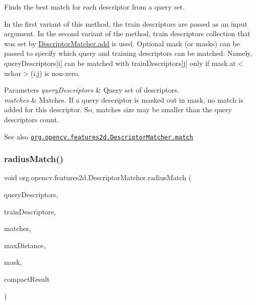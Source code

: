 Finds the best match for each descriptor from a query set.

In the first variant of this method, the train descriptors are passed as an input argument. In the second variant of the method, train descriptors collection that was set by {\ttfamily \mbox{\hyperlink{classorg_1_1opencv_1_1features2d_1_1_descriptor_matcher_aae08a476f7626406fb238bd32b28d1a3}{Descriptor\+Matcher.\+add}}} is used. Optional mask (or masks) can be passed to specify which query and training descriptors can be matched. Namely, {\ttfamily query\+Descriptors\mbox{[}i\mbox{]}} can be matched with {\ttfamily train\+Descriptors\mbox{[}j\mbox{]}} only if {\ttfamily mask.\+at$<$uchar$>$(i,j)} is non-\/zero.


\begin{DoxyParams}{Parameters}
{\em query\+Descriptors} & Query set of descriptors. \\
\hline
{\em matches} & Matches. If a query descriptor is masked out in {\ttfamily mask}, no match is added for this descriptor. So, {\ttfamily matches} size may be smaller than the query descriptors count.\\
\hline
\end{DoxyParams}
\begin{DoxySeeAlso}{See also}
\href{http://docs.opencv.org/modules/features2d/doc/common_interfaces_of_descriptor_matchers.html#descriptormatcher-match}{\tt org.\+opencv.\+features2d.\+Descriptor\+Matcher.\+match} 
\end{DoxySeeAlso}
\mbox{\label{classorg_1_1opencv_1_1features2d_1_1_descriptor_matcher_ac2151f66d3a14d78678b3474554cd677}} 
\subsubsection{\texorpdfstring{radius\+Match()}{radiusMatch()}\hspace{0.1cm}{\footnotesize\ttfamily [1/4]}}
{\footnotesize\ttfamily void org.\+opencv.\+features2d.\+Descriptor\+Matcher.\+radius\+Match (\begin{DoxyParamCaption}\item[{\mbox{\hyperlink{classorg_1_1opencv_1_1core_1_1_mat}{Mat}}}]{query\+Descriptors,  }\item[{\mbox{\hyperlink{classorg_1_1opencv_1_1core_1_1_mat}{Mat}}}]{train\+Descriptors,  }\item[{List$<$ \mbox{\hyperlink{classorg_1_1opencv_1_1core_1_1_mat_of_d_match}{Mat\+Of\+D\+Match}} $>$}]{matches,  }\item[{float}]{max\+Distance,  }\item[{\mbox{\hyperlink{classorg_1_1opencv_1_1core_1_1_mat}{Mat}}}]{mask,  }\item[{boolean}]{compact\+Result }\end{DoxyParamCaption})}


